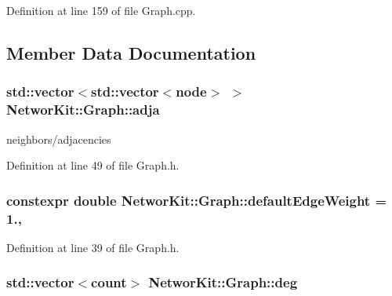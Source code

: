 Definition at line 159 of file Graph.\-cpp.



\subsection{Member Data Documentation}
\hypertarget{class_networ_kit_1_1_graph_ad731885a6d7d7cf22ec8a8babc77d389}{
\subsubsection[{adja}]{\setlength{\rightskip}{0pt plus 5cm}std\-::vector$<$std\-::vector$<${\bf node}$>$ $>$ Networ\-Kit\-::\-Graph\-::adja\hspace{0.3cm}{\ttfamily [protected]}}}\label{class_networ_kit_1_1_graph_ad731885a6d7d7cf22ec8a8babc77d389}


neighbors/adjacencies 



Definition at line 49 of file Graph.\-h.

\hypertarget{class_networ_kit_1_1_graph_af32663b9ad67bae546281e7725db3519}{
\subsubsection[{default\-Edge\-Weight}]{\setlength{\rightskip}{0pt plus 5cm}constexpr double Networ\-Kit\-::\-Graph\-::default\-Edge\-Weight = 1.\hspace{0.3cm}{\ttfamily [static]}, {\ttfamily [protected]}}}\label{class_networ_kit_1_1_graph_af32663b9ad67bae546281e7725db3519}


Definition at line 39 of file Graph.\-h.

\hypertarget{class_networ_kit_1_1_graph_a264a36a2017c51a1c3f71e7429e47b22}{
\subsubsection[{deg}]{\setlength{\rightskip}{0pt plus 5cm}std\-::vector$<${\bf count}$>$ Networ\-Kit\-::\-Graph\-::deg\hspace{0.3cm}{\ttfamily [protected]}}}\label{class_networ_kit_1_1_graph_a264a36a2017c51a1c3f71e7429e47b22}


